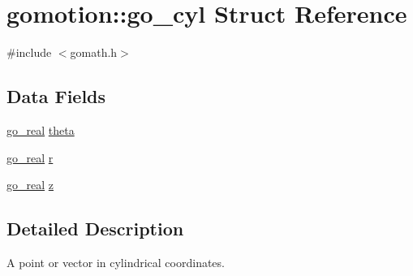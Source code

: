 \hypertarget{structgomotion_1_1go__cyl}{\section{gomotion\-:\-:go\-\_\-cyl Struct Reference}
\label{structgomotion_1_1go__cyl}
}


{\ttfamily \#include $<$gomath.\-h$>$}

\subsection*{Data Fields}
\begin{DoxyCompactItemize}
\item 
\hyperlink{gotypes_8h_afd666a2393eebd71ee455846ac9def9b}{go\-\_\-real} \hyperlink{structgomotion_1_1go__cyl_a7def1d9e1fea7c520be46ee08c134fd6}{theta}
\item 
\hyperlink{gotypes_8h_afd666a2393eebd71ee455846ac9def9b}{go\-\_\-real} \hyperlink{structgomotion_1_1go__cyl_a01ff0e161b92bff5b5742808fc0f5f02}{r}
\item 
\hyperlink{gotypes_8h_afd666a2393eebd71ee455846ac9def9b}{go\-\_\-real} \hyperlink{structgomotion_1_1go__cyl_ac2220c8506540fbbac2e17a8ee72bb45}{z}
\end{DoxyCompactItemize}


\subsection{Detailed Description}
A point or vector in cylindrical coordinates. 

